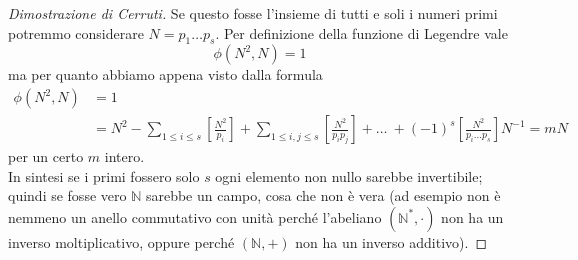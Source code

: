 \begin{proof}[Dimostrazione di Cerruti]
	Se questo fosse l'insieme di tutti e soli i numeri primi potremmo considerare $N=p_1\dots p_s$. Per definizione della funzione di Legendre vale
	\begin{equation*}
	\phi(N^2,N)=1
	\end{equation*}
	ma per quanto abbiamo appena visto dalla formula
	\begin{align*}
	\phi(N^2,N)&=1\\
	&=N^2-\sum_{1\leq i \leq s}\left[\frac{N^2}{p_i}\right]+\sum_{1\leq i,j \leq s}\left[\frac{N^2}{p_ip_j}\right]+ \dots \ + (-1)^s\left[\frac{N^2}{p_i\dots p_s}\right]N^{-1} = mN
	\end{align*}
	per un certo $m$ intero. \\ In sintesi se i primi fossero solo $s$ ogni elemento non nullo sarebbe invertibile; quindi se fosse vero $\mathbb{N}$ sarebbe un campo, cosa che non è vera (ad esempio non è nemmeno un anello commutativo con unità perché l'abeliano $(\mathbb{N}^*,\cdot)$ non ha un inverso moltiplicativo, oppure perché $(\mathbb{N},+)$ non ha un inverso additivo).
\end{proof}





